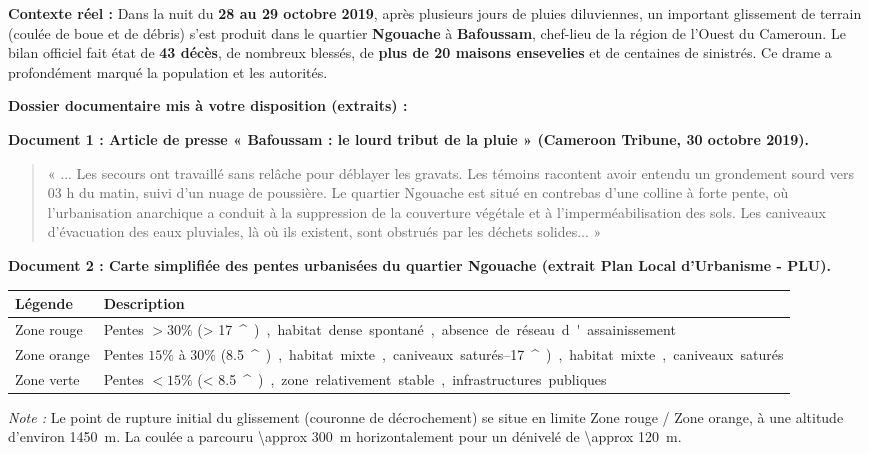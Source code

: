 \documentclass[11pt]{article}
\providecommand{\degree}{^{\circ}}
\newcommand{\cle}[1]{{\popxbold\color{popdark}#1}}
\newcounter{popsec}
\newcounter{popsub}
\newcommand{\courssub}[1]{%
  \stepcounter{popsub}%
  \par\vspace{9pt}\noindent{\popxbold\fontsize{11.5}{13}\selectfont\color{popink}{\color{poporange}\thepopsec.\thepopsub}\hspace{6pt}#1}\par\nopagebreak\vspace{4pt}
}
\begin{document}
\courssub{Situation}
\textbf{Contexte réel :} Dans la nuit du \textbf{28 au 29 octobre 2019}, après plusieurs jours de pluies diluviennes, un important \cle{glissement de terrain} (coulée de boue et de débris) s'est produit dans le quartier \textbf{Ngouache} à \textbf{Bafoussam}, chef-lieu de la région de l'Ouest du Cameroun. Le bilan officiel fait état de \textbf{43 décès}, de nombreux blessés, de \textbf{plus de 20 maisons ensevelies} et de centaines de sinistrés. Ce drame a profondément marqué la population et les autorités.

\textbf{Dossier documentaire mis à votre disposition (extraits) :}

\textbf{Document 1 : Article de presse « Bafoussam : le lourd tribut de la pluie » (Cameroon Tribune, 30 octobre 2019).}
\begin{quote}
« ... Les secours ont travaillé sans relâche pour déblayer les gravats. Les témoins racontent avoir entendu un grondement sourd vers 03 h du matin, suivi d'un nuage de poussière. Le quartier Ngouache est situé en contrebas d'une colline à forte pente, où l'urbanisation anarchique a conduit à la suppression de la couverture végétale et à l'imperméabilisation des sols. Les caniveaux d'évacuation des eaux pluviales, là où ils existent, sont obstrués par les déchets solides... »
\end{quote}

\textbf{Document 2 : Carte simplifiée des pentes urbanisées du quartier Ngouache (extrait Plan Local d'Urbanisme - PLU).}
\begin{center}
\begin{tabularx}{\linewidth}{|l|X|}\hline
\textbf{Légende} & \textbf{Description} \\ \hline
\cellcolor{popred!30} Zone rouge & Pentes $> 30\%$ (\SI{> 17}{\degree}), habitat dense spontané, absence de réseau d'assainissement \\ \hline
\cellcolor{poporange!30} Zone orange & Pentes $15\%$ à $30\%$ (\SIrange{8.5}{17}{\degree}), habitat mixte, caniveaux saturés \\ \hline
\cellcolor{popgreen!30} Zone verte & Pentes $< 15\%$ (\SI{< 8.5}{\degree}), zone relativement stable, infrastructures publiques \\ \hline
\end{tabularx}
\end{center}
\textit{Note :} Le point de rupture initial du glissement (couronne de décrochement) se situe en limite Zone rouge / Zone orange, à une altitude d'environ \SI{1450}{m}. La coulée a parcouru \SI{\approx 300}{m} horizontalement pour un dénivelé de \SI{\approx 120}{m}.
\end{document}
